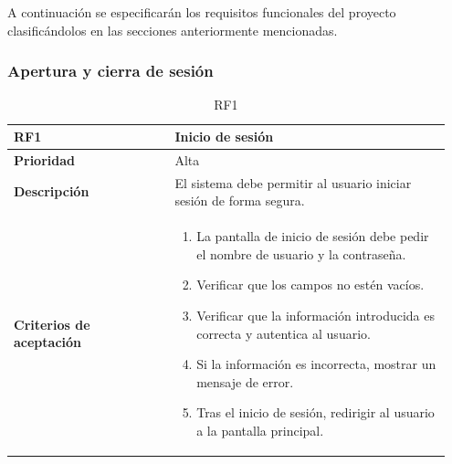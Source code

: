 A continuación se especificarán los requisitos funcionales del proyecto clasificándolos en las secciones anteriormente mencionadas. 


\subsubsection{Apertura y cierra de sesión}

\begin{table}[htb!]
	\centering %
	\begin{tabular}{|p{0.35\linewidth}|p{0.6\linewidth}|}
		\hline
		\rowcolor{grayshade} \textbf{RF1} & \textbf{Inicio de sesión} \\
		\hline
		\textbf{Prioridad} & Alta \\
		\hline
		\textbf{Descripción} & El sistema debe permitir al usuario iniciar sesión de forma segura.  \\
		\hline
		\vspace{0.5mm}
		\textbf{Criterios de aceptación} & 
		\begin{minipage}[t]{0.9\linewidth}
			\begin{enumerate}
				\item La pantalla de inicio de sesión debe pedir el nombre de usuario y la contraseña.
				\item Verificar que los campos no estén vacíos.
				\item Verificar que la información introducida es correcta y autentica al usuario.
				\item Si la información es incorrecta, mostrar un mensaje de error.
				\item Tras el inicio de sesión, redirigir al usuario a la pantalla principal.
			\end{enumerate}
			\vspace{2mm}
		\end{minipage} \\
		\hline
	\end{tabular}
	\caption{RF1}
\end{table}

\newpage

